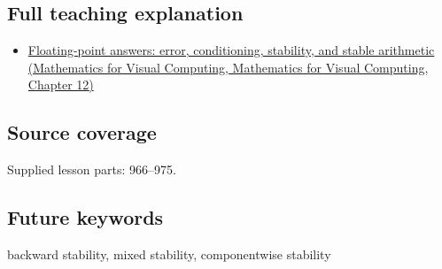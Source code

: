 \subsection{Full teaching explanation}\label{appendix-aa2bf0d79639-full-teaching-explanation}

\begin{itemize}
\tightlist
\item
  \href{../02-Mathematics-for-Visual-Computing/main.pdf\#nameddest=02-foundations-ii-ch028-floating-point-answers-error-conditioning-stability-and-stable-arithmetic}{Floating-point answers: error, conditioning, stability, and stable arithmetic (Mathematics for Visual Computing, Mathematics for Visual Computing, Chapter 12)}
\end{itemize}

\subsection{Source coverage}\label{appendix-aa2bf0d79639-source-coverage}

Supplied lesson parts: 966--975.

\subsection{Future keywords}\label{appendix-aa2bf0d79639-future-keywords}

backward stability, mixed stability, componentwise stability
